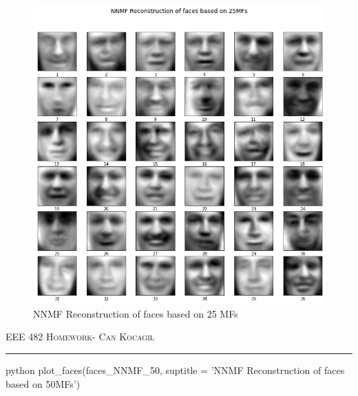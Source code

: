\documentclass[12pt]{amsart}
\begin{document}
\begin{figure}[h]
    \centering
        \includegraphics[width = 1\textwidth]{images/Q1/NNMF Reconstruction of faces based on 25MFs.png}
        \caption{NNMF Reconstruction of faces based on 25 MFs}
\end{figure}


\newpage
{\scshape EEE 482} \hfill {\scshape \large  Homework-\relax} \hfill {\scshape Can Kocagil}
\smallskip
\hrule
\vspace{2mm}

\begin{mintedbox}{python}
plot_faces(faces_NNMF_50, suptitle = 'NNMF Reconstruction of faces based on 50MFs')
\end{mintedbox}
\end{document}
